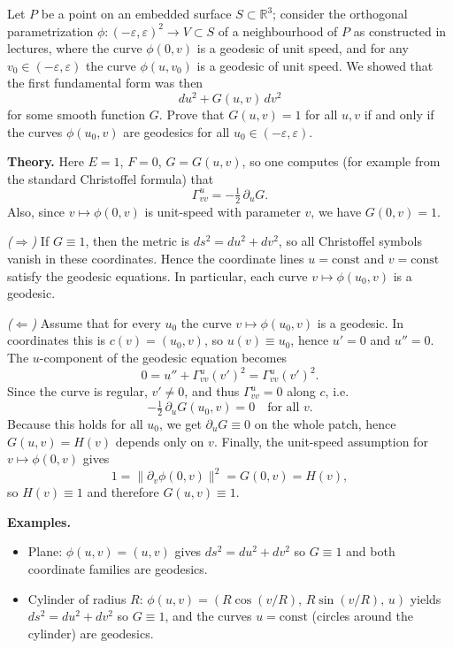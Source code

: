 \begin{problem}
\label{prob:cp-vii-0065}
Let $P$ be a point on an embedded surface $S\subset \mathbb{R}^3$; consider the orthogonal parametrization
$\phi:(-\varepsilon,\varepsilon)^2\to V\subset S$ of a neighbourhood of $P$ as constructed in lectures, where the curve
$\phi(0,v)$ is a geodesic of unit speed, and for any $v_0\in(-\varepsilon,\varepsilon)$ the curve $\phi(u,v_0)$ is
a geodesic of unit speed. We showed that the first fundamental form was then
\[
du^2 + G(u,v)\,dv^2
\]
for some smooth function $G$. Prove that $G(u,v)=1$ for all $u,v$ if and only if the curves $\phi(u_0,v)$ are
geodesics for all $u_0\in(-\varepsilon,\varepsilon)$.

\medskip
\textbf{Theory.}
Here $E=1$, $F=0$, $G=G(u,v)$, so one computes (for example from the standard Christoffel formula) that
\[
\Gamma^{u}_{vv}=-\tfrac12\,\partial_u G.
\]
Also, since $v\mapsto \phi(0,v)$ is unit-speed with parameter $v$, we have $G(0,v)=1$.

\medskip
\end{problem}

\begin{solution}
\emph{($\Rightarrow$)} If $G\equiv 1$, then the metric is $ds^2=du^2+dv^2$, so all Christoffel symbols vanish in
these coordinates. Hence the coordinate lines $u=\mathrm{const}$ and $v=\mathrm{const}$ satisfy the geodesic equations.
In particular, each curve $v\mapsto \phi(u_0,v)$ is a geodesic.

\smallskip
\emph{($\Leftarrow$)} Assume that for every $u_0$ the curve $v\mapsto \phi(u_0,v)$ is a geodesic.
In coordinates this is $c(v)=(u_0,v)$, so $u(v)\equiv u_0$, hence $u'=0$ and $u''=0$.
The $u$-component of the geodesic equation becomes
\[
0=u''+\Gamma^{u}_{vv}(v')^2=\Gamma^{u}_{vv}(v')^2.
\]
Since the curve is regular, $v'\neq 0$, and thus $\Gamma^{u}_{vv}=0$ along $c$, i.e.
\[
-\tfrac12\,\partial_u G(u_0,v)=0\quad \text{for all }v.
\]
Because this holds for all $u_0$, we get $\partial_u G\equiv 0$ on the whole patch, hence $G(u,v)=H(v)$ depends only on $v$.
Finally, the unit-speed assumption for $v\mapsto\phi(0,v)$ gives
\[
1=\|\partial_v\phi(0,v)\|^2 = G(0,v)=H(v),
\]
so $H(v)\equiv 1$ and therefore $G(u,v)\equiv 1$.

\medskip
\textbf{Examples.}
\begin{itemize}
	\item Plane: $\phi(u,v)=(u,v)$ gives $ds^2=du^2+dv^2$ so $G\equiv 1$ and both coordinate families are geodesics.
	\item Cylinder of radius $R$: $\phi(u,v)=(R\cos(v/R),\,R\sin(v/R),\,u)$ yields $ds^2=du^2+dv^2$ so $G\equiv 1$,
	and the curves $u=\mathrm{const}$ (circles around the cylinder) are geodesics.
\end{itemize}
\end{solution}

